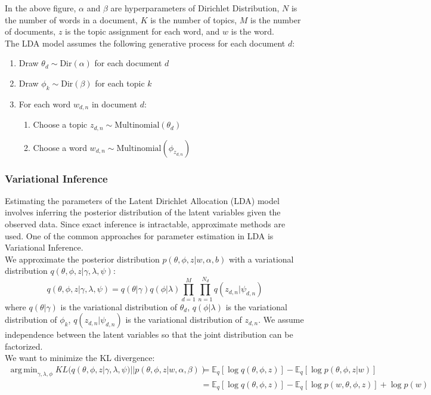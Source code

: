 \documentclass{article}
\DeclareMathOperator*{\argmin}{arg\,min}
\begin{document}
\noindent In the above figure, $\alpha$ and $\beta$ are hyperparameters of Dirichlet Distribution, $N$ is the number of words in a document, $K$ is the number of topics, $M$ is the number of documents, $z$ is the topic assignment for each word, and $w$ is the word. \\

\noindent The LDA model assumes the following generative process for each document $d$:
\begin{enumerate}
    \item Draw $\theta_d \sim \text{Dir}(\alpha)$ for each document $d$
    \item Draw $\phi_k \sim \text{Dir}(\beta)$ for each topic $k$
    \item For each word $w_{d,n}$ in document $d$:
    \begin{enumerate}
        \item Choose a topic $z_{d,n} \sim \text{Multinomial}(\theta_d)$
        \item Choose a word $w_{d,n} \sim \text{Multinomial}(\phi_{z_{d,n}})$
    \end{enumerate}
\end{enumerate}

\subsubsection{Variational Inference}
\noindent Estimating the parameters of the Latent Dirichlet Allocation (LDA) model involves inferring the posterior distribution of the latent variables given the observed data. Since exact inference is intractable, approximate methods are used. One of the common approaches for parameter estimation in LDA is Variational Inference.\\

\noindent We approximate the posterior distribution $p(\theta,\phi,z|w,\alpha,b)$ with a variational distribution $q(\theta,\phi,z|\gamma,\lambda,\psi)$: \[q(\theta,\phi,z|\gamma,\lambda,\psi)=q(\theta|\gamma)q(\phi|\lambda)\prod_{d=1}^M\prod_{n=1}^{N_d}q(z_{d,n}|\psi_{d,n})\]
where $q(\theta|\gamma)$ is the variational distribution of $\theta_d$, $q(\phi|\lambda)$ is the variational distribution of $\phi_k$, $q(z_{d,n}|\psi_{d,n})$ is the variational distribution of $z_{d,n}$. We assume independence between the latent variables so that the joint distribution can be factorized.\\

\noindent We want to minimize the KL divergence:
\begin{equation*}
    \begin{split}
\argmin_{\gamma,\lambda,\phi}KL(q(\theta,\phi,z|\gamma,\lambda,\psi)||p(\theta,\phi,z|w,\alpha,\beta))&=\mathbb{E}_q[\log q(\theta,\phi,z)]-\mathbb{E}_q[\log p(\theta,\phi,z|w)]\\
        &=\mathbb{E}_q[\log q(\theta,\phi,z)]-\mathbb{E}_q[\log p(w,\theta,\phi,z)]+\log p(w)
    \end{split}
\end{equation*}\\
\end{document}

